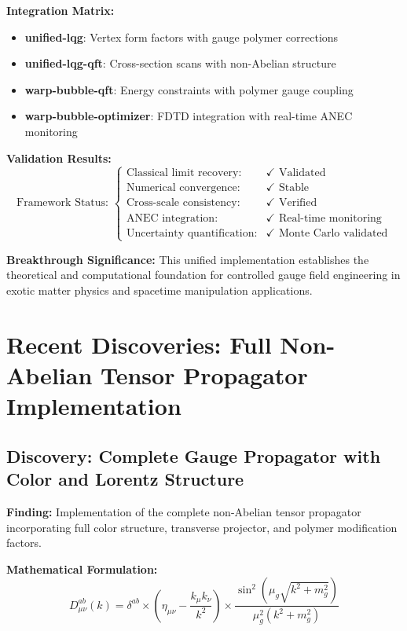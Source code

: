 \documentclass[11pt]{article}
\begin{document}
\textbf{Integration Matrix:}
\begin{itemize}
    \item \textbf{unified-lqg}: Vertex form factors with gauge polymer corrections
    \item \textbf{unified-lqg-qft}: Cross-section scans with non-Abelian structure
    \item \textbf{warp-bubble-qft}: Energy constraints with polymer gauge coupling
    \item \textbf{warp-bubble-optimizer}: FDTD integration with real-time ANEC monitoring
\end{itemize}

\textbf{Validation Results:}
\begin{equation}
\boxed{\text{Framework Status: } \begin{cases}
\text{Classical limit recovery:} & \checkmark \text{ Validated} \\
\text{Numerical convergence:} & \checkmark \text{ Stable} \\
\text{Cross-scale consistency:} & \checkmark \text{ Verified} \\
\text{ANEC integration:} & \checkmark \text{ Real-time monitoring} \\
\text{Uncertainty quantification:} & \checkmark \text{ Monte Carlo validated}
\end{cases}}
\end{equation}

\textbf{Breakthrough Significance:} This unified implementation establishes the theoretical and computational foundation for controlled gauge field engineering in exotic matter physics and spacetime manipulation applications.

\section{Recent Discoveries: Full Non-Abelian Tensor Propagator Implementation}

\subsection{Discovery: Complete Gauge Propagator with Color and Lorentz Structure}

\textbf{Finding:} Implementation of the complete non-Abelian tensor propagator incorporating full color structure, transverse projector, and polymer modification factors.

\textbf{Mathematical Formulation:}
\begin{equation}
\boxed{D^{ab}_{\mu\nu}(k) = \delta^{ab} \times \left(\eta_{\mu\nu} - \frac{k_\mu k_\nu}{k^2}\right) \times \frac{\sin^2(\mu_g\sqrt{k^2 + m_g^2})}{\mu_g^2(k^2 + m_g^2)}}
\end{equation}
\end{document}
